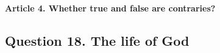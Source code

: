\documentclass{ucetd}
\begin{document}
\paragraph{Article 4. Whether true and false are contraries?}

\subsection{Question 18. The life of God}
\end{document}
